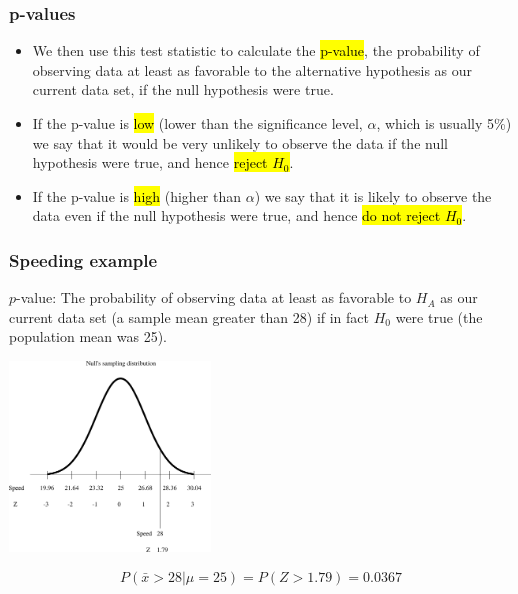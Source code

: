 
\begin{frame}
\frametitle{p-values}

\begin{itemize}

\item We then use this test statistic to calculate the \hl{p-value}, the probability of observing data at least as favorable to the alternative hypothesis as our current data set, if the null hypothesis were true.

\pause

\item If the p-value is \hl{low} (lower than the significance level, $\alpha$, which is usually 5\%) we say that it would be very unlikely to observe the data if the null hypothesis were true, and hence \hl{reject $H_0$}.

\pause

\item If the p-value is \hl{high} (higher than $\alpha$) we say that it is likely to observe the data even if the null hypothesis were true, and hence \hl{do not reject $H_0$}.

\end{itemize}

\end{frame}


\begin{frame}
\frametitle{Speeding example}
$p$-value: The probability of observing data at least as favorable to $H_A$ as our current data set (a sample mean greater than 28) if in fact $H_0$ were true (the population mean was 25).
\begin{center}
\includegraphics[width=0.4\textwidth]{4-3_hyp_test/figures/null.png}
\end{center} 
\pause

$$P(\bar{x} > 28 | \mu = 25) = P(Z > 1.79) = 0.0367 $$

\end{frame}

